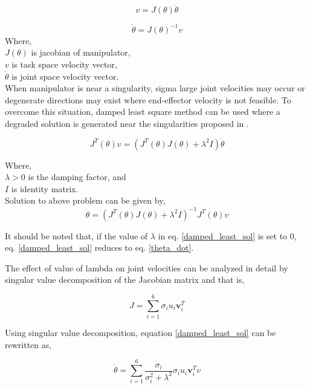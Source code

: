 \begin{equation}\label{theta_dot}
	v = J(\theta) \dot{\theta} 
\end{equation}

\begin{equation}
	\dot{\theta} = J(\theta)^{-1}  v
\end{equation} 
Where, \\
$J(\theta)$ is jacobian of manipulator, \\
$v$ is task space velocity vector, \\
$\dot{\theta}$ is joint space velocity vector. \\

When manipulator is near a singularity, sigma  large joint velocities may occur or degenerate directions may exist where end-effector velocity
is not feasible\cite{chiaverini1994review}. To overcome this situation, damped least square method can be used where a degraded solution is generated near the singularities proposed in \cite{wampler1986manipulator, nakamura1986inverse}.  

\begin{equation}
	J^{T}(\theta)v = (J^{T}(\theta)J(\theta) + \lambda ^{2}I)\dot{\theta}
\end{equation}

Where, \\
$\lambda > 0 $ is the damping factor, and \\
$I $ is identity matrix. \\

Solution to above problem can be given by, 
\begin{equation}\label{damped_least_sol}
	\dot{\theta} = (J^{T}(\theta)J(\theta) + \lambda^{2}I)^{-1}J^{T}(\theta)v
\end{equation} 

It should be noted that, if the value of $\lambda$ in eq. \ref{damped_least_sol} is set to 0, eq. \ref{damped_least_sol} reduces to eq. \ref{theta_dot}.

The effect of value of lambda on joint velocities can be analyzed in detail by singular value decomposition of the Jacobian matrix and that is, 

\begin{equation}
	J = \sum_{i=1}^{6}\sigma_{i}u_{i}\textbf{v}_{i}^{T}
\end{equation} 

Using singular value decomposition, equation \ref{damped_least_sol} can be rewritten as,

\begin{equation}
\dot{\theta} = \sum_{i=1}^{6}\frac{\sigma_{i}}{\sigma_{i}^{2} + \lambda^{2} }\sigma_{i}u_{i}\textbf{v}_{i}^{T}v
\end{equation} 

